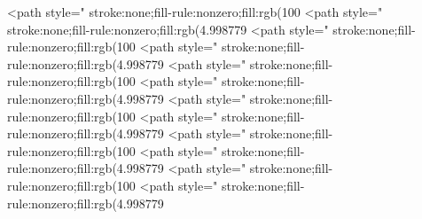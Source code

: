 <path style=" stroke:none;fill-rule:nonzero;fill:rgb(100%
<path style=" stroke:none;fill-rule:nonzero;fill:rgb(4.998779%
<path style=" stroke:none;fill-rule:nonzero;fill:rgb(100%
<path style=" stroke:none;fill-rule:nonzero;fill:rgb(4.998779%
<path style=" stroke:none;fill-rule:nonzero;fill:rgb(100%
<path style=" stroke:none;fill-rule:nonzero;fill:rgb(4.998779%
<path style=" stroke:none;fill-rule:nonzero;fill:rgb(100%
<path style=" stroke:none;fill-rule:nonzero;fill:rgb(4.998779%
<path style=" stroke:none;fill-rule:nonzero;fill:rgb(100%
<path style=" stroke:none;fill-rule:nonzero;fill:rgb(4.998779%
<path style=" stroke:none;fill-rule:nonzero;fill:rgb(100%
<path style=" stroke:none;fill-rule:nonzero;fill:rgb(4.998779%

